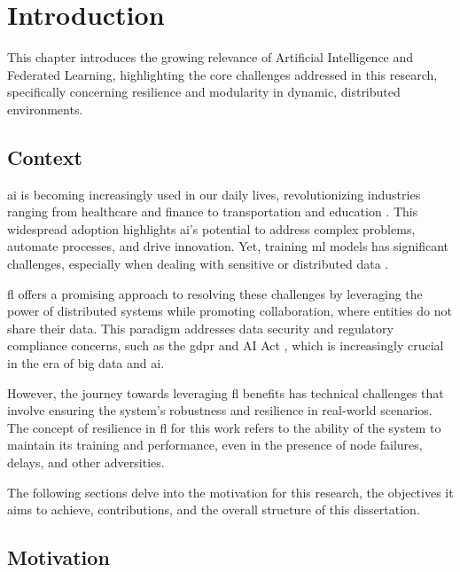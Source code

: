 \chapter{Introduction}
\label{chapter:introduction}

\begin{introduction}

This chapter introduces the growing relevance of Artificial Intelligence and Federated Learning, highlighting the core challenges addressed in this research, specifically concerning resilience and modularity in dynamic, distributed environments.

\end{introduction}


\section{Context}

\ac{ai} is becoming increasingly used in our daily lives, revolutionizing industries ranging from healthcare and finance to transportation and education \cite{rashid2024ai}. This widespread adoption highlights \ac{ai}'s potential to address complex problems, automate processes, and drive innovation. Yet, training \ac{ml} models has significant challenges, especially when dealing with sensitive or distributed data \cite{xu2021privacy}.

\ac{fl} offers a promising approach to resolving these challenges by leveraging the power of distributed systems while promoting collaboration, where entities do not share their data. This paradigm addresses data security and regulatory compliance concerns, such as the \ac{gdpr} and AI Act \cite{durovic2024privacy}, which is increasingly crucial in the era of big data and \ac{ai}.

However, the journey towards leveraging \ac{fl} benefits has technical challenges that involve ensuring the system's robustness and resilience in real-world scenarios. The concept of resilience in \ac{fl} for this work refers to the ability of the system to maintain its training and performance, even in the presence of node failures, delays, and other adversities.

The following sections delve into the motivation for this research, the objectives it aims to achieve, contributions, and the overall structure of this dissertation.



\section{Motivation}
\label{sec:motivation}

